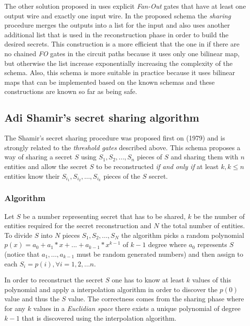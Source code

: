 \documentclass[12pt]{article}
\begin{document}
The other solution proposed in \cite{fltccd} uses explicit \textit{Fan-Out} gates that have at least one output wire and exactly one input wire. In the proposed schema the \textit{sharing} procedure merges the outputs into a list for the input and also uses another additional list that is used in the reconstruction phase in order to build the desired secrets. This construction is a more efficient that the one in \cite{gghsw} if there are no chained \textit{FO} gates in the circuit paths because it uses only one bilinear map, but otherwise the list increase exponentially increasing the complexity of the schema. Also, this schema is more suitable in practice because it uses bilinear maps that can be implemented based on the known schemas and these constructions are known so far as being safe.

\subsection{Adi Shamir's secret sharing algorithm}

The Shamir's secret sharing procedure was proposed first on \cite{shamir}(1979) and is strongly related to the \textit{threshold gates} described above. This schema proposes a way of sharing a secret $S$ using $S_1, S_2, ..., S_n$ pieces of $S$ and sharing them with $n$ entities and allow the secret $S$ to be reconstructed \textit{if and only if} at least $k, k \le n$ entities know their $S_{i_1}, S_{i_2}, ..., S_{i_k}$ pieces of the $S$ secret. 

\subsubsection{Algorithm}

Let $S$ be a number representing secret that has to be shared, $k$ be the number of entities required for the secret reconstruction and $N$ the total number of entities. To divide $S$ into $N$ pieces $S_1, S_2, ..., S_N$ the algorithm picks a random polynomial $p(x) = a_0 + a_1 * x + ... + a_{k - 1} * x^{k - 1}$ of $k - 1$ degree where $a_0$ represents $S$ (notice that $a_1, ..., a_{k - 1}$ must be random generated numbers) and then assign to each $S_i = p(i), \forall i = {1, 2, ... n}$.

In order to reconstruct the secret $S$ one has to know at least $k$ values of this polynomial and apply a interpolation algorithm in order to discover the $p(0)$ value and thus the $S$ value. The correctness comes from the sharing phase where for any $k$ values in a \textit{Euclidian space} there exists a unique polynomial of degree $k - 1$ that is discovered using the interpolation algorithm.
\end{document}
